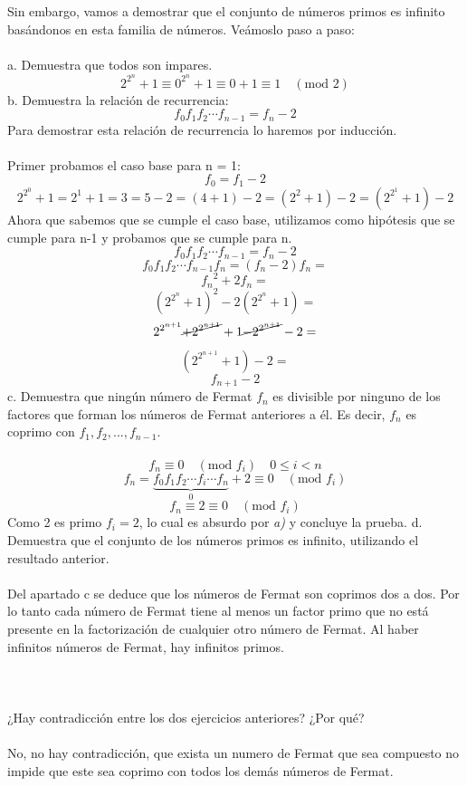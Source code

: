 \documentclass{article}
\begin{document}
\section{}
Sin embargo, vamos a demostrar que el conjunto de números primos es infinito basándonos en esta familia de números. Veámoslo paso a paso:\\\\
a. Demuestra que todos son impares.
$$
2^{2^{n}} + 1 \equiv 0^{2^{n}} + 1 \equiv 0 + 1 \equiv  1  \quad (\text{mod } 2)
$$
b. Demuestra la relación de recurrencia:
$$
f_0 f_1 f_2 \cdots f_{n-1} = f_{n} - 2
$$
\noindent Para demostrar esta relación de recurrencia lo haremos por inducción.\\\\
Primer probamos el caso base para n = 1:
$$
f_0 = f_1 - 2
$$
$$
2^{2^{0}}+1=2^{1}+1=3=5-2=(4+1)-2=(2^2 +1)-2 = (2^{2^{1}} +1)-2 
$$
Ahora que sabemos que se cumple el caso base, utilizamos como hipótesis que se cumple para n-1 y probamos que se cumple para n.
$$
f_0 f_1 f_2 \cdots f_{n-1} = f_n - 2
$$
$$
f_0 f_1 f_2 \cdots f_{n-1} f_n = (f_n - 2)f_n =
$$
$$
{f_n}^2 + 2f_n = 
$$
$$
(2^{2^{n}}+1)^2 -2(2^{2^{n}}+1)=
$$
$$
2^{2^{n+1}}\cancel{+2^{2^{n+1}}}+1 \cancel{-2^{2^{n+1}}}-2 =
$$
$$
(2^{2^{n+1}}+1)-2 =
$$
$$
f_{n+1}-2
$$
c. Demuestra que ningún número de Fermat $f_n$ es divisible por ninguno de los factores que forman los números de Fermat anteriores a él. Es decir, $f_n$ es coprimo
con $f_1,f_2,...,f_{n-1}$.\\\\
$$
f_n \equiv 0 \quad (\text{mod } f_i) \quad 0\leq i < n
$$
$$
f_n=\underbrace{f_0 f_1 f_2 \cdots f_i \cdots f_n}_0 +2 \equiv 0\quad (\text{mod } f_i)
$$
$$
f_n \equiv 2 \equiv 0 \quad (\text{mod } f_i)
$$
Como 2 es primo $f_i = 2$, lo cual es absurdo por \textit{a)} y concluye la prueba.\newpage\noindent
d. Demuestra que el conjunto de los números primos es infinito, utilizando el resultado anterior.\\\\
Del apartado c se deduce que los números de Fermat son coprimos dos a dos. Por lo tanto cada número de Fermat tiene al menos un factor primo que no está presente en la factorización de cualquier otro número de Fermat. Al haber infinitos números de Fermat, hay infinitos primos.\\\\
\section{}
¿Hay contradicción entre los dos ejercicios anteriores? ¿Por qué?\\\\
No, no hay contradicción, que exista un numero de Fermat que sea compuesto no impide que este sea coprimo con todos los demás números de Fermat.
\end{document}
